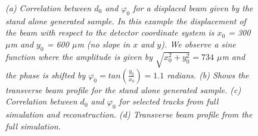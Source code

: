 \documentclass{cmspaper}
\begin{document}
\begin{figure}[htp]
  \centering
      
    \caption{\it (a) Correlation between $d_{0}$ and $\varphi_{0}$ for a displaced beam 
      given by the stand alone generated sample. In this example the displacement 
      of the beam with respect to the detector coordinate system is  $x_0$ =
      300 $\mu$m and  $y_0$ = 600 $\mu$m (no slope in $x$ and $y$). We 
      observe a sine function where the amplitude is given by $\sqrt{x_0^2 +y_0^2}=734$
      $\mu$m and the phase is shifted by $\varphi_0=tan\left(\frac{y_0}{x_0}\right) = 1.1 $ radians. (b) Shows the transverse beam profile for the stand alone generated sample.
      (c) Correlation between $d_0$ and $\varphi_0$ for selected tracks from full simulation and reconstruction.
      (d) Transverse beam profile from the full simulation.
    }
    \label{fig:d0_phi}
\end{figure}
\end{document}
